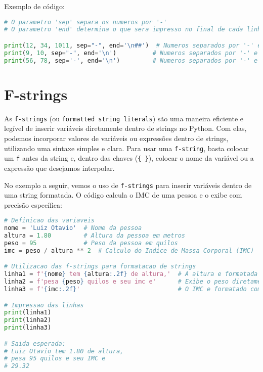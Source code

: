 \documentclass{article}
\begin{document}
Exemplo de código:

\begin{lstlisting}[language=Python]
# O parametro 'sep' separa os numeros por '-'
# O parametro 'end' determina o que sera impresso no final de cada linha

print(12, 34, 1011, sep="-", end='\n##')  # Numeros separados por '-' e quebra de linha com '##'
print(9, 10, sep="-", end='\n')          # Numeros separados por '-' e quebra de linha
print(56, 78, sep='-', end='\n')         # Numeros separados por '-' e quebra de linha
\end{lstlisting}

\section{F-strings}

As \texttt{f-strings} (ou \texttt{formatted string literals}) são uma maneira eficiente e legível de inserir variáveis diretamente dentro de strings no Python. Com elas, podemos incorporar valores de variáveis ou expressões dentro de strings, utilizando uma sintaxe simples e clara. Para usar uma \texttt{f-string}, basta colocar um \texttt{f} antes da string e, dentro das chaves (\texttt{\{ \}}), colocar o nome da variável ou a expressão que desejamos interpolar.

No exemplo a seguir, vemos o uso de \texttt{f-strings} para inserir variáveis dentro de uma string formatada. O código calcula o IMC de uma pessoa e o exibe com precisão específica:

\begin{lstlisting}[language=Python]
# Definicao das variaveis
nome = 'Luiz Otavio'  # Nome da pessoa
altura = 1.80         # Altura da pessoa em metros
peso = 95             # Peso da pessoa em quilos
imc = peso / altura ** 2  # Calculo do Indice de Massa Corporal (IMC)

# Utilizacao das f-strings para formatacao de strings
linha1 = f'{nome} tem {altura:.2f} de altura,'  # A altura e formatada com 2 casas decimais
linha2 = f'pesa {peso} quilos e seu imc e'      # Exibe o peso diretamente
linha3 = f'{imc:.2f}'                           # O IMC e formatado com 2 casas decimais

# Impressao das linhas
print(linha1)
print(linha2)
print(linha3)

# Saida esperada:
# Luiz Otavio tem 1.80 de altura,
# pesa 95 quilos e seu IMC e
# 29.32
\end{lstlisting}
\end{document}
